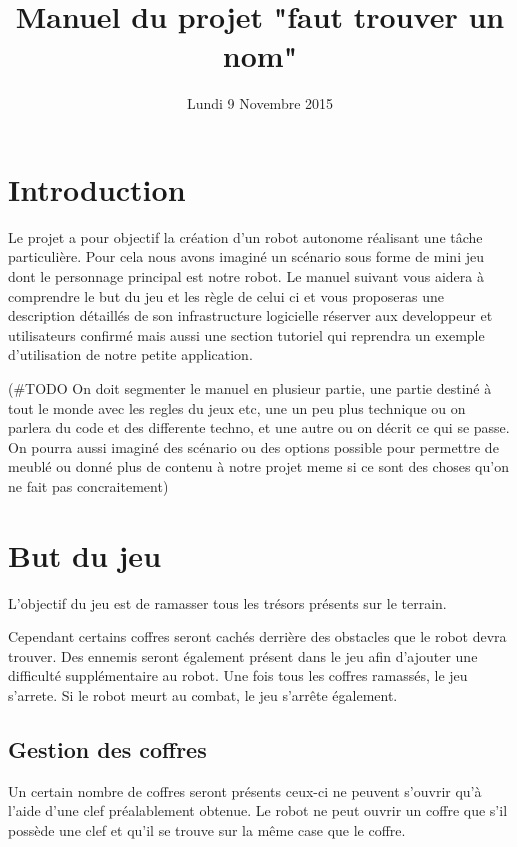 \documentclass[a4paper 12pts]{article}
\title{Manuel du projet "faut trouver un nom"}
\date{Lundi 9 Novembre 2015}
\author{}
\begin{document}
\maketitle

\section{Introduction}

Le projet a pour objectif la création d'un robot autonome réalisant une tâche particulière.
Pour cela nous avons imaginé un scénario sous forme de mini jeu dont le personnage principal est notre robot.
Le manuel suivant vous aidera à comprendre le but du jeu et les règle de celui ci et vous proposeras une description détaillés de son infrastructure logicielle réserver aux developpeur et utilisateurs confirmé mais aussi une section tutoriel qui reprendra un exemple d'utilisation de notre petite application.

(#TODO On doit segmenter le manuel en plusieur partie, une partie destiné à tout le monde avec les regles du jeux etc, une un peu plus technique ou on parlera du code et des differente techno, et une autre ou on décrit ce qui se passe.
On pourra aussi imaginé des scénario ou des options possible pour permettre de meublé ou donné plus de contenu à notre projet meme si ce sont des choses qu'on ne fait pas concraitement)

\section{But du jeu}


L'objectif du jeu est de ramasser tous les trésors présents sur le terrain.


Cependant certains coffres seront cachés derrière des obstacles que le robot devra trouver. Des ennemis seront également présent dans le jeu afin d'ajouter une difficulté supplémentaire au robot.
Une fois tous les coffres ramassés, le jeu s'arrete.
Si le robot meurt au combat, le jeu s'arrête également.


\subsection{Gestion des coffres}


Un certain nombre de coffres seront présents ceux-ci ne peuvent s'ouvrir qu'à l'aide d'une clef préalablement obtenue.
Le robot ne peut ouvrir un coffre que s'il possède une clef et qu'il se trouve sur la même case que le coffre.
\end{document}
